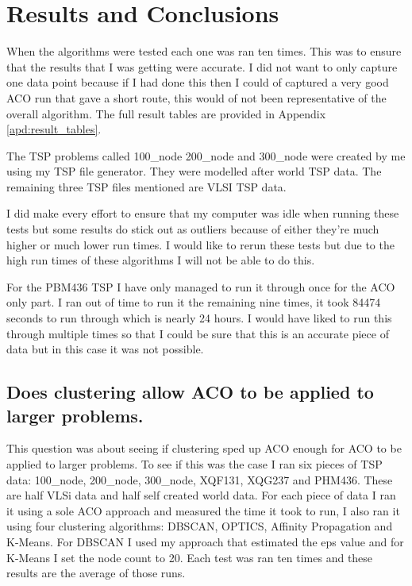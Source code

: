 \chapter{Results and Conclusions}

When the algorithms were tested each one was ran ten times. This was to ensure that the results that I was getting were accurate. I did not want to only capture one data point because if I had done this then I could of captured a very good ACO run that gave a short route, this would of not been representative of the overall algorithm. The full result tables are provided in Appendix \ref{apd:result_tables}.

The TSP problems called 100\_node 200\_node and 300\_node were created by me using my TSP file generator. They were modelled after world TSP data. The remaining three TSP files mentioned are VLSI TSP data.

I did make every effort to ensure that my computer was idle when running these tests but some results do stick out as outliers because of either they're much higher or much lower run times. I would like to rerun these tests but due to the high run times of these algorithms I will not be able to do this. 

For the PBM436 TSP I have only managed to run it through once for the ACO only part. I ran out of time to run it the remaining nine times, it took 84474 seconds to run through which is nearly 24 hours. I would have liked to run this through multiple times so that I could be sure that this is an accurate piece of data but in this case it was not possible.

\section{Does clustering allow ACO to be applied to larger problems.}

This question was about seeing if clustering sped up ACO enough for ACO to be applied to larger problems. To see if this was the case I ran six pieces of TSP data: 100\_node, 200\_node, 300\_node, XQF131, XQG237 and PHM436. These are half VLSi data and half self created world data. For each piece of data I ran it using a sole ACO approach and measured the time it took to run, I also ran it using four clustering algorithms: DBSCAN, OPTICS, Affinity Propagation and K-Means. For DBSCAN I used my approach that estimated the eps value and for K-Means I set the node count to 20. Each test was ran ten times and these results are the average of those runs.

